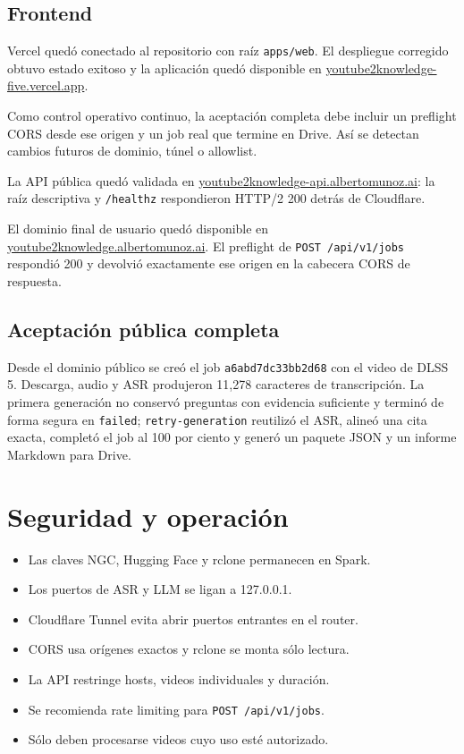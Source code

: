 \documentclass[11pt,a4paper]{article}
\begin{document}
\subsection{Frontend}
Vercel quedó conectado al repositorio con raíz \texttt{apps/web}. El despliegue
corregido obtuvo estado exitoso y la aplicación quedó disponible en
\href{https://youtube2knowledge-five.vercel.app/}
{youtube2knowledge-five.vercel.app}.

Como control operativo continuo, la aceptación completa debe incluir un preflight
CORS desde ese origen y un job real que termine en Drive. Así se detectan cambios
futuros de dominio, túnel o allowlist.

La API pública quedó validada en
\href{https://youtube2knowledge-api.albertomunoz.ai/}
{youtube2knowledge-api.albertomunoz.ai}: la raíz descriptiva y
\texttt{/healthz} respondieron HTTP/2 200 detrás de Cloudflare.

El dominio final de usuario quedó disponible en
\href{https://youtube2knowledge.albertomunoz.ai/}
{youtube2knowledge.albertomunoz.ai}. El preflight de
\texttt{POST /api/v1/jobs} respondió 200 y devolvió exactamente ese origen en
la cabecera CORS de respuesta.

\subsection{Aceptación pública completa}
Desde el dominio público se creó el job \texttt{a6abd7dc33bb2d68} con el video de
DLSS 5. Descarga, audio y ASR produjeron 11,278 caracteres de transcripción. La
primera generación no conservó preguntas con evidencia suficiente y terminó de
forma segura en \texttt{failed}; \texttt{retry-generation} reutilizó el ASR,
alineó una cita exacta, completó el job al 100 por ciento y generó un paquete JSON
y un informe Markdown para Drive.

\section{Seguridad y operación}
\begin{itemize}
  \item Las claves NGC, Hugging Face y rclone permanecen en Spark.
  \item Los puertos de ASR y LLM se ligan a 127.0.0.1.
  \item Cloudflare Tunnel evita abrir puertos entrantes en el router.
  \item CORS usa orígenes exactos y rclone se monta sólo lectura.
  \item La API restringe hosts, videos individuales y duración.
  \item Se recomienda rate limiting para \texttt{POST /api/v1/jobs}.
  \item Sólo deben procesarse videos cuyo uso esté autorizado.
\end{itemize}
\end{document}
